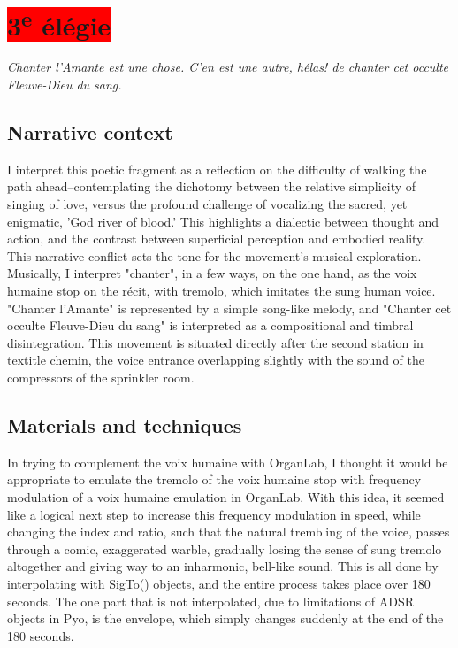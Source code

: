 \documentclass[12pt,twoside,maitrise]{dms_ks}
\theoremstyle{definition}
\begin{document}
{

\section{\colorbox{red}{3\textsuperscript{e} élégie}}

\epigraph{\textit{Chanter l'Amante est une chose. C'en est une autre, hélas! de chanter cet occulte Fleuve-Dieu du sang.}}{}

\subsection{Narrative context}

I interpret this poetic fragment as a reflection on the difficulty of walking the path ahead--contemplating the dichotomy between the relative simplicity of singing of love, versus the profound challenge of vocalizing the sacred, yet enigmatic, 'God river of blood.'  
This highlights a dialectic between thought and action, and the contrast between superficial perception and embodied reality.  
This narrative conflict sets the tone for the movement's musical exploration.  
Musically, I interpret "chanter", in a few ways, on the one hand, as the voix humaine stop on the récit, with tremolo, which imitates the sung human voice.  
"Chanter l'Amante" is represented by a simple song-like melody, and "Chanter cet occulte Fleuve-Dieu du sang" is interpreted as a compositional and timbral disintegration. 
This movement is situated directly after the second station in textit{le chemin}, the voice entrance overlapping slightly with the sound of the compressors of the sprinkler room.

\subsection{Materials and techniques}

In trying to complement the voix humaine with OrganLab, I thought it would be appropriate to emulate the tremolo of the voix humaine stop with frequency modulation of a voix humaine emulation in OrganLab.  
With this idea, it seemed like a logical next step to increase this frequency modulation in speed, while changing the index and ratio, such that the natural trembling of the voice, passes through a comic, exaggerated warble, gradually losing the sense of sung tremolo altogether and giving way to an inharmonic, bell-like sound.  
This is all done by interpolating with SigTo() objects, and the entire process takes place over 180 seconds.  
The one part that is not interpolated, due to limitations of ADSR objects in Pyo, is the envelope, which simply changes suddenly at the end of the 180 seconds.

}
\end{document}
